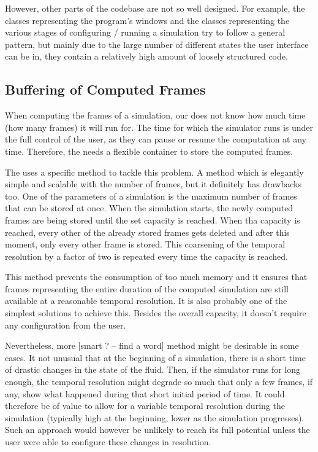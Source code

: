 \documentclass[11pt,a4paper,twoside,openright]{report}
\begin{document}
However, other parts of the codebase are not so well designed. For example, the classes representing the program's windows and the classes representing the various stages of configuring / running a simulation try to follow a general pattern, but mainly due to the large number of different states the user interface can be in, they contain a relatively high amount of loosely structured code.

\subsection{Buffering of Computed Frames}
When computing the frames of a simulation, our \software{} does not know how much time (how many frames) it will run for. The time for which the simulator runs is under the full control of the user, as they can pause or resume the computation at any time. Therefore, the \software{} needs a flexible container to store the computed frames.

The \software{} uses a specific method to tackle this problem. A method which is elegantly simple and scalable with the number of frames, but it definitely has drawbacks too. One of the parameters of a simulation is the maximum number of frames that can be stored at once. When the simulation starts, the newly computed frames are being stored until the set capacity is reached. When tha capacity is reached, every other of the already stored frames gets deleted and after this moment, only every other frame is stored. This coarsening of the temporal resolution by a factor of two is repeated every time the capacity is reached.

This method prevents the consumption of too much memory and it ensures that frames representing the entire duration of the computed simulation are still available at a reasonable temporal resolution. It is also probably one of the simplest solutions to achieve this. Besides the overall capacity, it doesn't require any configuration from the user.

Nevertheless, more [smart ? -- find a word] method might be desirable in some cases. It not unusual that at the beginning of a simulation, there is a short time of drastic changes in the state of the fluid. Then, if the simulator runs for long enough, the temporal resolution might degrade so much that only a few frames, if any, show what happened during that short initial period of time. It could therefore be of value to allow for a variable temporal resolution during the simulation (typically high at the beginning, lower as the simulation progresses). Such an approach would however be unlikely to reach its full potential unless the user were able to configure these changes in resolution.
\end{document}
